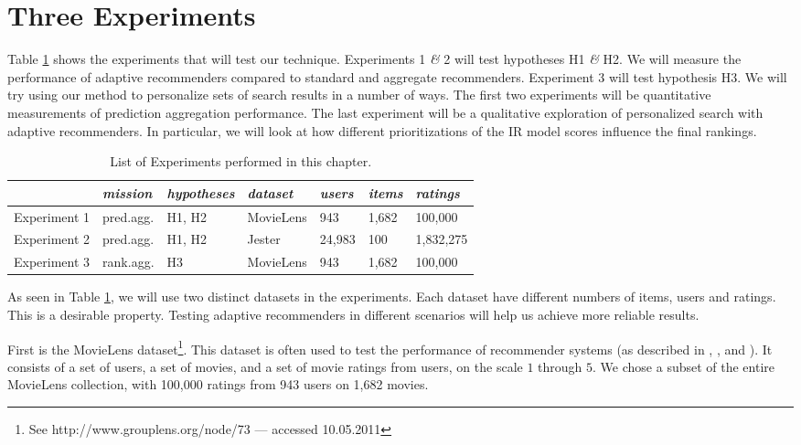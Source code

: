 \section{Three Experiments}

Table \ref{table:experiments} shows the experiments that will test our technique.
Experiments 1 \emph{\&} 2 will test hypotheses H1 \emph{\&} H2.
We will measure the performance of adaptive recommenders compared to standard and aggregate recommenders.
Experiment 3 will test hypothesis H3.
We will try using our method to personalize sets of search results in a number of ways.
The first two experiments will be quantitative measurements of prediction aggregation performance.
The last experiment will be a qualitative exploration of personalized search with adaptive recommenders.
In particular, we will look at how different prioritizations of the IR model scores influence the final rankings.

\vspace{1em}
\begin{table}[h]
  \begin{tabular*}{\textwidth}{ l l l l l l l }
    \toprule
      ~ & 
      \emph{mission} &
      \emph{hypotheses} &
      \emph{dataset} &
      \emph{users} &
      \emph{items} &
      \emph{ratings} \\
    \midrule
    
    Experiment 1 &
    pred.agg. &
    H1, H2 &
    MovieLens &
    943 &
    1,682 &
    100,000 \\
    
    Experiment 2 &
    pred.agg. &
    H1, H2 &
    Jester &
    24,983 &
    100 &
    1,832,275 \\

    Experiment 3 &
    rank.agg. &
    H3 &
    MovieLens &
    943 &
    1,682 &
    100,000 \\

    
    \bottomrule 
  \end{tabular*}
  \caption[List of Experiments]{List of Experiments performed in this chapter.}
  \label{table:experiments}
\end{table}

\noindent
As seen in Table \ref{table:experiments}, 
we will use two distinct datasets in the experiments.
Each dataset have different numbers of items, users and ratings.
This is a desirable property.
Testing adaptive recommenders in different scenarios
will help us achieve more reliable results.

First is the MovieLens dataset\footnote{
See http://www.grouplens.org/node/73 --- accessed 10.05.2011}.
This dataset is often used to test the performance of recommender systems
(as described in 
\citet[p9]{Alshamri2008}, \citet[p4]{Lemire2005}, \citet[p1]{Adomavicius2005} and \citet[p2]{Herlocker2004}).
It consists of a set of users, a set of movies, and a set of movie ratings from users,
on the scale $1$ through $5$.
We chose a subset of the entire MovieLens collection, with 100,000 ratings from 943 users on 1,682 movies.

